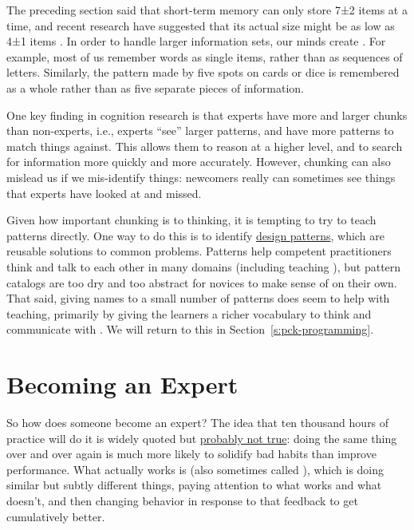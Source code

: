 The preceding section said that short-term memory can only store
7±2 items at a time, and recent research have suggested that its
actual size might be as low as 4±1 items \cite{Dida2016}. In
order to handle larger information sets, our minds create
. For example, most of us remember words
as single items, rather than as sequences of letters. Similarly, the
pattern made by five spots on cards or dice is remembered as a whole
rather than as five separate pieces of information.

One key finding in cognition research is that experts have more and
larger chunks than non-experts, i.e., experts ``see'' larger patterns, and
have more patterns to match things against. This allows them to reason
at a higher level, and to search for information more quickly and more
accurately. However, chunking can also mislead us if we mis-identify
things: newcomers really can sometimes see things that experts have
looked at and missed.

Given how important chunking is to thinking, it is tempting to try to
teach patterns directly. One way to do this is to identify \href{https://en.wikipedia.org/wiki/Software\_design\_pattern}{design
patterns}, which are reusable solutions to common
problems. Patterns help competent practitioners think and talk to each
other in many domains (including teaching \cite{Berg2012}), but
pattern catalogs are too dry and too abstract for novices to make
sense of on their own. That said, giving names to a small number of
patterns does seem to help with teaching, primarily by giving the
learners a richer vocabulary to think and communicate with
\cite{Kuit2004,Byck2005,Saja2006}. We will
return to this in Section~\ref{s:pck-programming}.

\section{Becoming an Expert}\label{s:memory-becoming-expert}

So how does someone become an expert? The idea that ten thousand hours
of practice will do it is widely quoted but \href{http://www.goodlifeproject.com/podcast/anders-ericsson/}{probably not
true}: doing the same thing over and over again is
much more likely to solidify bad habits than improve performance. What
actually works is  (also
sometimes called ), which
is doing similar but subtly different things, paying attention to what
works and what doesn't, and then changing behavior in response to that
feedback to get cumulatively better.

